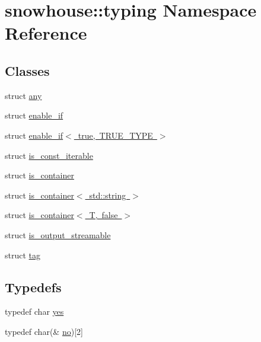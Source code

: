 \hypertarget{namespacesnowhouse_1_1typing}{}\section{snowhouse\+::typing Namespace Reference}
\label{namespacesnowhouse_1_1typing}
\subsection*{Classes}
\begin{DoxyCompactItemize}
\item 
struct \mbox{\hyperlink{structsnowhouse_1_1typing_1_1any}{any}}
\item 
struct \mbox{\hyperlink{structsnowhouse_1_1typing_1_1enable__if}{enable\+\_\+if}}
\item 
struct \mbox{\hyperlink{structsnowhouse_1_1typing_1_1enable__if_3_01true_00_01TRUE__TYPE_01_4}{enable\+\_\+if$<$ true, T\+R\+U\+E\+\_\+\+T\+Y\+P\+E $>$}}
\item 
struct \mbox{\hyperlink{structsnowhouse_1_1typing_1_1is__const__iterable}{is\+\_\+const\+\_\+iterable}}
\item 
struct \mbox{\hyperlink{structsnowhouse_1_1typing_1_1is__container}{is\+\_\+container}}
\item 
struct \mbox{\hyperlink{structsnowhouse_1_1typing_1_1is__container_3_01std_1_1string_01_4}{is\+\_\+container$<$ std\+::string $>$}}
\item 
struct \mbox{\hyperlink{structsnowhouse_1_1typing_1_1is__container_3_01T_00_01false_01_4}{is\+\_\+container$<$ T, false $>$}}
\item 
struct \mbox{\hyperlink{structsnowhouse_1_1typing_1_1is__output__streamable}{is\+\_\+output\+\_\+streamable}}
\item 
struct \mbox{\hyperlink{structsnowhouse_1_1typing_1_1tag}{tag}}
\end{DoxyCompactItemize}
\subsection*{Typedefs}
\begin{DoxyCompactItemize}
\item 
typedef char \mbox{\hyperlink{namespacesnowhouse_1_1typing_a4b319cb7567ee3475023c05ed2dadb16}{yes}}
\item 
typedef char(\& \mbox{\hyperlink{namespacesnowhouse_1_1typing_ad9bd8c4cca2c9f7de1faf7a7f53b1bda}{no}})\mbox{[}2\mbox{]}
\end{DoxyCompactItemize}
